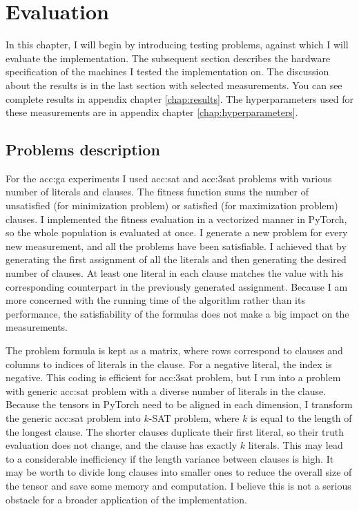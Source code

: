 \chapter{Evaluation}

In this chapter, I will begin by introducing testing problems, against which I will evaluate the implementation. The subsequent section describes the hardware specification of the machines I tested the implementation on. The discussion about the results is in the last section with selected measurements. You can see complete results in appendix chapter \ref{chap:results}. The hyperparameters used for these measurements are in appendix chapter \ref{chap:hyperparameters}.




\section{Problems description}
\label{chap:problems}

For the \acrlong{acc:ga} experiments I used \acrshort{acc:sat} and \acrshort{acc:3sat} problems with various number of literals and clauses. The fitness function sums the number of unsatisfied (for minimization problem) or satisfied (for maximization problem) clauses. I implemented the fitness evaluation in a vectorized manner in PyTorch, so the whole population is evaluated at once. I generate a new problem for every new measurement, and all the problems have been satisfiable. I achieved that by generating the first assignment of all the literals and then generating the desired number of clauses. At least one literal in each clause matches the value with his corresponding counterpart in the previously generated assignment. Because I am more concerned with the running time of the algorithm rather than its performance, the satisfiability of the formulas does not make a big impact on the measurements.

The problem formula is kept as a matrix, where rows correspond to clauses and columns to indices of literals in the clause. For a negative literal, the index is negative. This coding is efficient for \acrshort{acc:3sat} problem, but I run into a problem with generic \acrshort{acc:sat} problem with a diverse number of literals in the clause. Because the tensors in PyTorch need to be aligned in each dimension, I transform the generic \acrshort{acc:sat} problem into $k$-SAT problem, where $k$ is equal to the length of the longest clause. The shorter clauses duplicate their first literal, so their truth evaluation does not change, and the clause has exactly $k$ literals. This may lead to a considerable inefficiency if the length variance between clauses is high. It may be worth to divide long clauses into smaller ones to reduce the overall size of the tensor and save some memory and computation. I believe this is not a serious obstacle for a broader application of the implementation.

